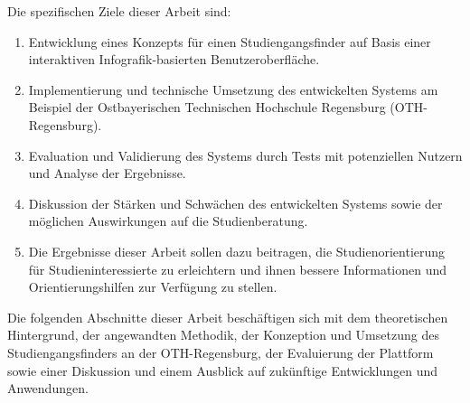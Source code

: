 Die spezifischen Ziele dieser Arbeit sind:
\begin{enumerate}
\item Entwicklung eines Konzepts für einen Studiengangsfinder auf Basis einer
interaktiven Infografik-basierten Benutzeroberfläche.
\item Implementierung und technische Umsetzung des entwickelten Systems am
Beispiel der Ostbayerischen Technischen Hochschule Regensburg (OTH-Regensburg).
\item Evaluation und Validierung des Systems durch Tests mit potenziellen
Nutzern und Analyse der Ergebnisse.
\item Diskussion der Stärken und Schwächen des entwickelten Systems sowie der
möglichen Auswirkungen auf die Studienberatung.
\item Die Ergebnisse dieser Arbeit sollen dazu beitragen, die
Studienorientierung für Studieninteressierte zu erleichtern und ihnen bessere
Informationen und Orientierungshilfen zur Verfügung zu stellen.
\end{enumerate}

Die folgenden Abschnitte dieser Arbeit beschäftigen sich mit dem theoretischen
Hintergrund, der angewandten Methodik, der Konzeption und Umsetzung des
Studiengangsfinders an der OTH-Regensburg, der Evaluierung der Plattform sowie
einer Diskussion und einem Ausblick auf zukünftige Entwicklungen und
Anwendungen.